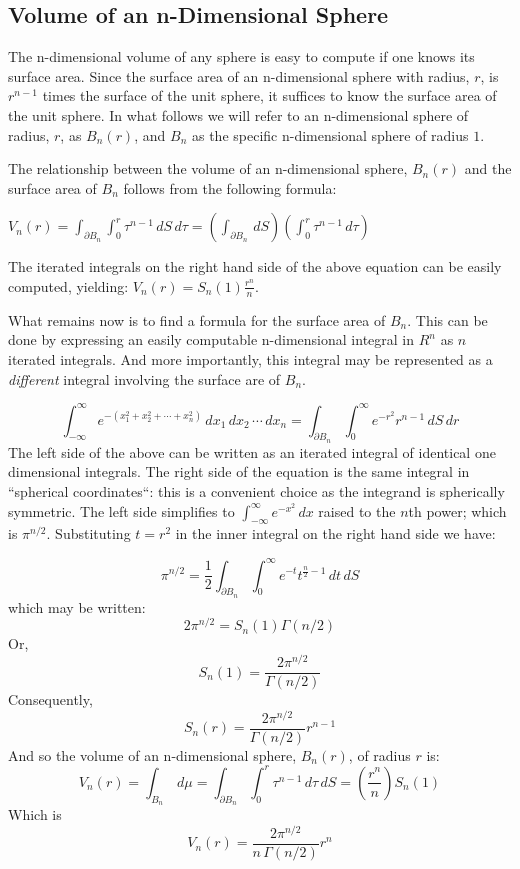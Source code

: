 {\subsection{Volume of an n-Dimensional Sphere}
The n-dimensional volume of any sphere is easy to compute if one 
knows its surface area. Since the surface area of an n-dimensional sphere 
with radius, $r$, is $r^{n-1}$ times the surface of the unit sphere, 
it suffices to know the surface area of the unit sphere.
In what follows we will refer to an n-dimensional sphere of radius, $r$, 
as $B_n(r)$, and $B_n$ as the specific n-dimensional sphere of radius $1$.

The relationship between the volume of an n-dimensional sphere, $B_n(r)$ 
and the surface area of $B_n$ follows from the following formula:%

${V}_n(r) =  \int_{\partial B_n} \int_0^r \tau^{n-1} \,dS \,d\tau = \left(\int_{\partial B_n} \, dS\right) \left( \int_0^r \tau^{n-1} \, d\tau \right)$

The iterated integrals on the right hand side of the above equation can 
be easily computed, yielding: ${V}_n(r) = {S}_n(1) \frac{r^n}{n}$.

What remains now is to find a formula for the surface area of $B_n.$
This can be done by expressing an easily computable 
n-dimensional integral in $R^n$ as $n$ iterated integrals. 
And more importantly, this integral may be represented as a {\it different\/} 
integral involving the surface are of $B_n$.

$$
\int_{-\infty}^{\infty} e^{-(x_1^2 + x_2^2 + \cdots + x_n^2)} \, dx_1\, dx_2
\, \cdots \, dx_n = \int_{\partial B_n} \int_0^\infty e^{-r^2} r^{n-1} \,
dS\, dr
$$
The left side of the above can be written as an iterated integral of identical 
one dimensional integrals. The right side of the equation is the same 
integral in ``spherical coordinates``: this is a convenient choice as 
the integrand is spherically symmetric. The left side simplifies to 
$\int_{-\infty}^{\infty} e^{-x^2} \, dx$ raised to the $n$th power;
which is $\pi^{n/2}$. Substituting $t = r^2$ in the inner integral on
the right hand side we have:

$$
\pi^{n/2} = \frac{1}{2} \int_{\partial B_n} \int_0^\infty 
e^{-t} t^{\frac{n}{2}-1} \,dt \, dS
$$
which may be written:%
$$
2 \pi^{n/2} = {S}_n(1) \Gamma(n/2)
$$
Or,
$$
{S}_n(1) = \frac{2 \pi^{n/2}}{\Gamma(n/2)}
$$
Consequently,
$$
{S}_n(r) = \frac{2 \pi^{n/2}}{\Gamma(n/2)}r^{n-1}
$$
And so the volume of an n-dimensional sphere, $B_n(r)$, of radius $r$ is:%
$$
{V}_n(r) = \int_{B_n} \, d\mu = \int_{\partial B_n} 
\int_0^r \tau^{n-1} \, d\tau \, dS = \left(\frac{r^n}{n}\right){S}_n(1)
$$
Which is
$$
{V}_n(r) = \frac{2\pi^{n/2}}{n \, \Gamma(n/2)} r^n
$$

}
